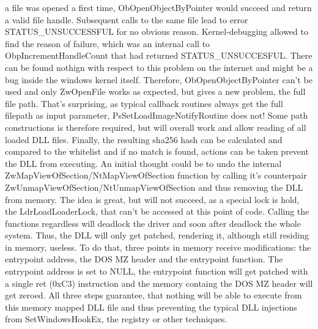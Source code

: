 a file was opened a first time, ObOpenObjectByPointer would succeed and return a valid file handle. Subsequent calls to the same file lead to error STATUS\_UNSUCCESSFUL for no obvious reason. Kernel-debugging allowed to find the reason of failure, which was an internal call to ObpIncrementHandleCount that had returned STATUS\_UNSUCCESFUL. There can be found nothign with respect to this problem on the internet and might be a bug inside the windows kernel itself. Therefore, ObOpenObjectByPointer can't be used and only ZwOpenFile works as expected, but gives a new problem, the full file path. That's surprising, as typical callback routines always get the full filepath as input parameter, PsSetLoadImageNotifyRoutine does not! Some path constructions is therefore required, but will overall work and allow reading of all loaded DLL files. Finally, the resulting sha256 hash can be calculated and compared to the whitelist and if no match is found, actions can be taken prevent the DLL from executing. An initial thought could be to undo the internal ZwMapViewOfSection/NtMapViewOfSection function by calling it's counterpair ZwUnmapViewOfSection/NtUnmapViewOfSection and thus removing the DLL from memory. The idea is great, but will not succeed, as a special lock is hold, the LdrLoadLoaderLock, that can't be accessed at this point of code. Calling the functions regardless will deadlock the driver and soon after deadlock the whole system. Thus, the DLL will only get patched, rendering it, although still residing in memory, useless. To do that, three points in memory receive modifications: the entrypoint address, the DOS MZ header and the entrypoint function. The entrypoint address is set to NULL, the entrypoint function will get patched with a single ret (0xC3) instruction and the memory containg the DOS MZ header will get zeroed. All three steps guarantee, that nothing will be able to execute from this memory mapped DLL file and thus preventing the typical DLL injections from SetWindowsHookEx, the registry or other techniques.